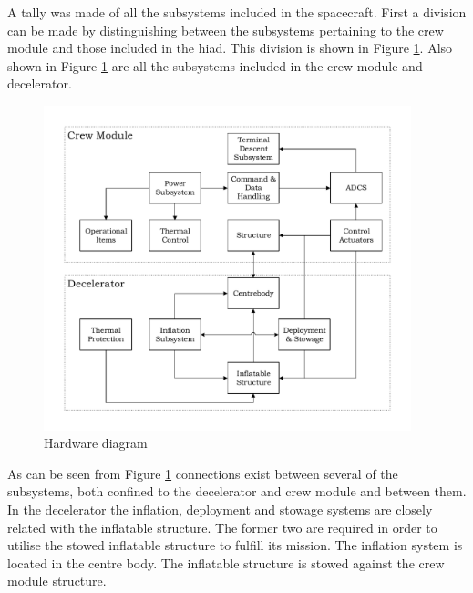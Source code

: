 A tally was made of all the subsystems included in the spacecraft. First a division can be made by distinguishing between the subsystems pertaining to the crew module and those included in the \gls{hiad}. This division is shown in Figure \ref{fig:subsystems}. Also shown in Figure \ref{fig:subsystems} are all the subsystems included in the crew module and decelerator.
\begin{figure}[h]
	\includegraphics[width=0.95\textwidth]{./Figure/subsystem_breakdown/hardware_structure.pdf}
	\caption{Hardware diagram}
	\label{fig:subsystems} 
\end{figure}
%
%
%
%
%
%

As can be seen from Figure \ref{fig:subsystems} connections exist between several of the subsystems, both confined to the decelerator and crew module and between them. In the decelerator the inflation, deployment and stowage systems are closely related with the inflatable structure. The former two are required in order to utilise the stowed inflatable structure to fulfill its mission. The inflation system is located in the centre body. The inflatable structure is stowed against the crew module structure.


